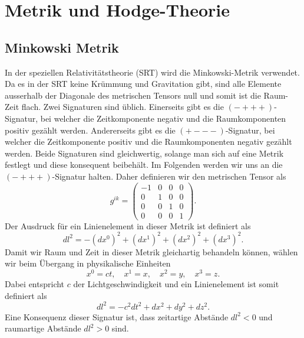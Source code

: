 %
%
%
%
\section{Metrik und Hodge-Theorie 
\label{maxwell:section:teil1}}

\subsection{Minkowski Metrik}
In der speziellen Relativitätstheorie (SRT) wird die Minkowski-Metrik verwendet.
%
%
%
Da es in der SRT keine Krümmung und Gravitation gibt, sind alle Elemente ausserhalb der Diagonale des metrischen Tensors null und somit ist die Raum-Zeit flach.
Zwei Signaturen sind üblich.
Einerseits gibt es die $({-}{+}{+}{+})$-Signatur, bei welcher die Zeitkomponente negativ und die Raumkomponenten positiv gezählt werden.
Andererseits gibt es die $({+}{-}{-}{-})$-Signatur, bei welcher die Zeitkomponente positiv und die Raumkomponenten negativ gezählt werden.
Beide Signaturen sind gleichwertig, solange man sich auf eine Metrik festlegt und diese konsequent beibehält.
Im Folgenden werden wir uns an die $({-}{+}{+}{+})$-Signatur halten.
Daher definieren wir den metrischen Tensor als
\begin{equation}
	g^{ik} = \begin{pmatrix}
		-1 & 0 & 0 & 0 \\ 0 & 1 & 0 & 0 \\ 0 & 0 & 1 & 0 \\ 0 & 0 & 0 & 1 
	\end{pmatrix}.
	\label{maxwell:section:teil1:metrik}
\end{equation}
Der Ausdruck für ein Linienelement in dieser Metrik ist definiert als
\begin{equation*}
	dl^2 = -(dx^0)^2 +(dx^1)^2+(dx^2)^2+(dx^3)^2.
\end{equation*}
Damit wir Raum und Zeit in dieser Metrik gleichartig behandeln können, wählen wir beim Übergang in physikalische Einheiten 
\begin{equation}
	\label{maxwell:koordinaten}
	x^0 = ct,\quad x^1 = x,\quad x^2 = y, \quad x^3 = z .
\end{equation}
Dabei entspricht $c$ der Lichtgeschwindigkeit und ein Linienelement ist somit definiert als
\begin{equation*}
	dl^2 = -c^2dt^2 +dx^2+dy^2+dz^2.
\end{equation*}
Eine Konsequenz dieser Signatur ist, dass zeitartige Abstände $dl^2 < 0$ und raumartige Abstände $dl^2 > 0$ sind.

